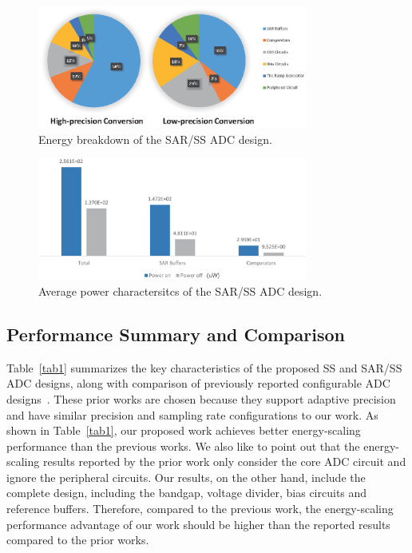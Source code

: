 \begin{figure}[htbp]
	\centerline{\includegraphics[width=3.5in]{./Figures/SARResults1.eps}}
	\caption{Energy breakdown of the SAR/SS ADC design.}
	\label{SARresults1}
\end{figure} 

\begin{figure}[htbp]
	\centerline{\includegraphics[width=3.5in]{./Figures/SARResults2.eps}}
	\caption{Average power charactersitcs of the SAR/SS ADC design.}
	\label{SARresults2}
\end{figure} 

\subsection{Performance Summary and Comparison}\label{summary}

Table~\ref{tab1} summarizes the key characteristics of the proposed SS and SAR/SS ADC designs,
along with comparison of previously reported configurable ADC designs~\cite{zhu_06_2013,yip_resolution-reconfigurable_2013}. 
These prior works are chosen because they support adaptive precision and have similar precision 
and sampling rate configurations to our work. As shown in Table~\ref{tab1}, our proposed work 
achieves better energy-scaling performance than the previous works. We also like to point out that
the energy-scaling results reported by the prior work only consider the core ADC circuit
and ignore the peripheral circuits. Our results, on the other hand, include the complete 
design, including the bandgap, voltage divider, bias circuits and reference buffers. Therefore, 
compared to the previous work, the energy-scaling performance advantage of our work should
be higher than the reported results compared to the prior works. 

